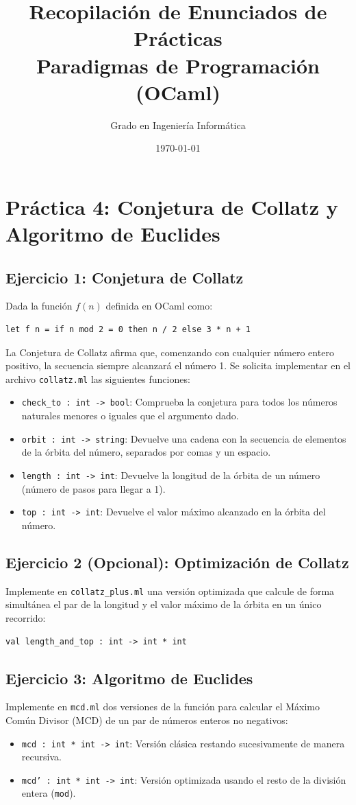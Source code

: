 \documentclass[11pt,a4paper]{article}
\title{\textbf{Recopilación de Enunciados de Prácticas}\\Paradigmas de Programación (OCaml)}
\author{Grado en Ingeniería Informática}
\date{\today}
\begin{document}
\maketitle
\tableofcontents
\newpage

\section{Práctica 4: Conjetura de Collatz y Algoritmo de Euclides}
\subsection{Ejercicio 1: Conjetura de Collatz}
Dada la función $f(n)$ definida en OCaml como:
\begin{lstlisting}
let f n = if n mod 2 = 0 then n / 2 else 3 * n + 1
\end{lstlisting}
La Conjetura de Collatz afirma que, comenzando con cualquier número entero positivo, la secuencia siempre alcanzará el número 1. Se solicita implementar en el archivo \texttt{collatz.ml} las siguientes funciones:
\begin{itemize}
    \item \texttt{check\_to : int -> bool}: Comprueba la conjetura para todos los números naturales menores o iguales que el argumento dado.
    \item \texttt{orbit : int -> string}: Devuelve una cadena con la secuencia de elementos de la órbita del número, separados por comas y un espacio.
    \item \texttt{length : int -> int}: Devuelve la longitud de la órbita de un número (número de pasos para llegar a 1).
    \item \texttt{top : int -> int}: Devuelve el valor máximo alcanzado en la órbita del número.
\end{itemize}

\subsection{Ejercicio 2 (Opcional): Optimización de Collatz}
Implemente en \texttt{collatz\_plus.ml} una versión optimizada que calcule de forma simultánea el par de la longitud y el valor máximo de la órbita en un único recorrido:
\begin{lstlisting}
val length_and_top : int -> int * int
\end{lstlisting}

\subsection{Ejercicio 3: Algoritmo de Euclides}
Implemente en \texttt{mcd.ml} dos versiones de la función para calcular el Máximo Común Divisor (MCD) de un par de números enteros no negativos:
\begin{itemize}
    \item \texttt{mcd : int * int -> int}: Versión clásica restando sucesivamente de manera recursiva.
    \item \texttt{mcd' : int * int -> int}: Versión optimizada usando el resto de la división entera (\texttt{mod}).
\end{itemize}
\end{document}
